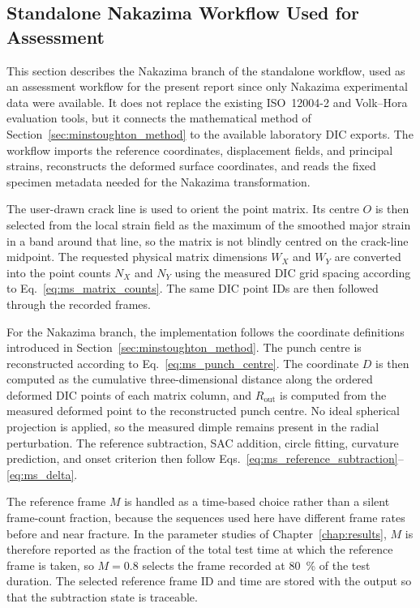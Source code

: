 \subsection{Standalone Nakazima Workflow Used for Assessment}
\label{sec:minstoughton_workflow_assessment}

This section describes the Nakazima branch of the standalone workflow, used
as an assessment workflow for the present report since only Nakazima
experimental data were available. It does not replace the existing
ISO~12004-2 and Volk--Hora evaluation tools, but it connects the mathematical method
of Section~\ref{sec:minstoughton_method} to the available laboratory DIC
exports. The workflow imports the  reference coordinates, displacement
fields, and principal strains, reconstructs the deformed surface coordinates,
and reads the fixed specimen metadata needed for the Nakazima transformation.

The user-drawn crack line is used to orient the point matrix. Its centre $O$ is
then selected from the local strain field as the maximum of the smoothed major
strain in a band around that line, so the matrix is not blindly centred on the
crack-line midpoint. The requested physical matrix dimensions $W_X$ and $W_Y$
are converted into the point counts $N_X$ and $N_Y$ using the measured DIC grid
spacing according to Eq.~\eqref{eq:ms_matrix_counts}. The same DIC point IDs are
then followed through the recorded frames.

For the Nakazima branch, the implementation follows the coordinate definitions
introduced in Section~\ref{sec:minstoughton_method}. The punch centre is
reconstructed according to Eq.~\eqref{eq:ms_punch_centre}. The coordinate $D$
is then computed as the cumulative three-dimensional distance along the ordered
deformed DIC points of each matrix column, and $R_\mathrm{out}$ is computed
from the measured deformed point to the reconstructed punch centre. No ideal
spherical projection is applied, so the measured dimple remains present in the
radial perturbation. The reference subtraction, SAC addition, circle fitting,
curvature prediction, and onset criterion then follow
Eqs.~\eqref{eq:ms_reference_subtraction}--\eqref{eq:ms_delta}.

The reference frame $M$ is handled as a time-based choice rather than a silent
frame-count fraction, because the  sequences used here have
different frame rates before and near fracture. In the parameter studies of
Chapter~\ref{chap:results}, $M$ is therefore reported as the fraction of the
total test time at which the reference frame is taken, so $M=0.8$ selects the
frame recorded at \SI{80}{\percent} of the test duration. The selected
reference frame ID
and time are stored with the output so that the subtraction state is traceable.

